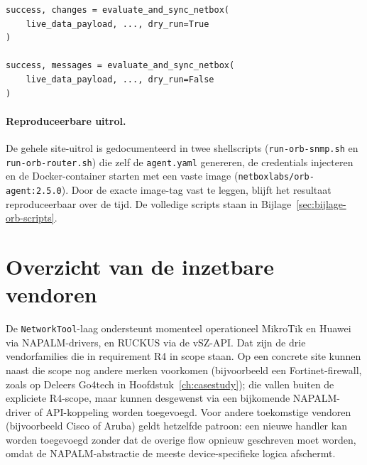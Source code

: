 \begin{listing}[H]
  \caption{Dry-run gevolgd door live push in NetworkTool}
  \label{lst:dryrun-cherry}
  \begin{verbatim}
success, changes = evaluate_and_sync_netbox(
    live_data_payload, ..., dry_run=True
)

success, messages = evaluate_and_sync_netbox(
    live_data_payload, ..., dry_run=False
)
  \end{verbatim}
\end{listing}

\paragraph{Reproduceerbare uitrol.} De gehele site-uitrol is gedocumenteerd in twee shellscripts (\texttt{run-orb-snmp.sh} en \texttt{run-orb-router.sh}) die zelf de \texttt{agent.yaml} genereren, de credentials injecteren en de Docker-container starten met een vaste image (\texttt{netboxlabs/orb-agent:2.5.0}). Door de exacte image-tag vast te leggen, blijft het resultaat reproduceerbaar over de tijd. De volledige scripts staan in Bijlage~\ref{sec:bijlage-orb-scripts}.

\section{Overzicht van de inzetbare vendoren}

De \texttt{NetworkTool}-laag ondersteunt momenteel operationeel MikroTik en Huawei via NAPALM-drivers, en RUCKUS via de vSZ-API. Dat zijn de drie vendorfamilies die in requirement R4 in scope staan. Op een concrete site kunnen naast die scope nog andere merken voorkomen (bijvoorbeeld een Fortinet-firewall, zoals op Deleers Go4tech in Hoofdstuk~\ref{ch:casestudy}); die vallen buiten de expliciete R4-scope, maar kunnen desgewenst via een bijkomende NAPALM-driver of API-koppeling worden toegevoegd. Voor andere toekomstige vendoren (bijvoorbeeld Cisco of Aruba) geldt hetzelfde patroon: een nieuwe handler kan worden toegevoegd zonder dat de overige flow opnieuw geschreven moet worden, omdat de NAPALM-abstractie de meeste device-specifieke logica afschermt\autocite{NAPALM}.
